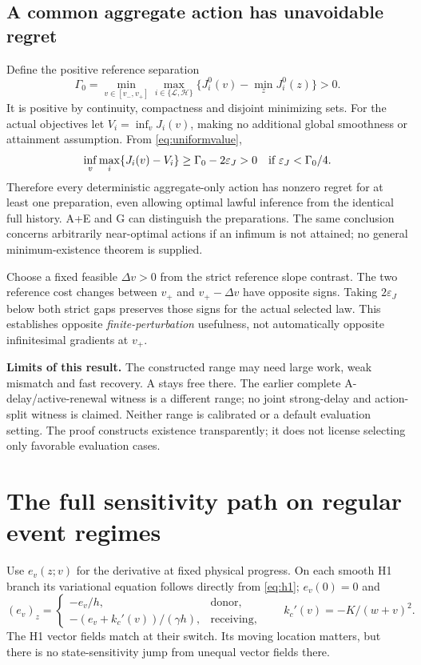 \documentclass[11pt,a4paper]{article}
\begin{document}
\subsection{A common aggregate action has unavoidable regret}
Define the positive reference separation
\begin{equation}
 \Gamma_0=\min_{v\in[v_-,v_+]}\max_{i\in\{\mathcal L,\mathcal H\}}
 \{J_i^0(v)-\min_zJ_i^0(z)\}>0.
 \label{eq:refregret}
\end{equation}
It is positive by continuity, compactness and disjoint minimizing sets.
For the actual objectives let $V_i=\inf_vJ_i(v)$, making no additional
global smoothness or attainment assumption. From \eqref{eq:uniformvalue},
\begin{equation}
 \inf_v\max_i\{J_i(v)-V_i\}\geq\Gamma_0-2\varepsilon_J>0
 \quad\hbox{if }\varepsilon_J<\Gamma_0/4.
 \label{eq:actualregret}
\end{equation}
Therefore every deterministic aggregate-only action has nonzero regret
for at least one preparation, even allowing optimal lawful inference from
the identical full history. A+E and G can distinguish the preparations.
The same conclusion concerns arbitrarily near-optimal actions if an
infimum is not attained; no general minimum-existence theorem is supplied.

Choose a fixed feasible $\Delta v>0$ from the strict reference slope
contrast. The two reference cost changes between $v_+$ and $v_+-\Delta v$
have opposite signs. Taking $2\varepsilon_J$ below both strict gaps
preserves those signs for the actual selected law. This establishes
opposite \emph{finite-perturbation} usefulness, not automatically opposite
infinitesimal gradients at $v_+$.

\textbf{Limits of this result.} The constructed range may need large work,
weak mismatch and fast recovery. A stays free there. The earlier complete
A-delay/active-renewal witness is a different range; no joint strong-delay
and action-split witness is claimed. Neither range is calibrated or a
default evaluation setting. The proof constructs existence transparently;
it does not license selecting only favorable evaluation cases.

\section{The full sensitivity path on regular event regimes}
Use $e_v(z;v)$ for the derivative at fixed physical progress. On each
smooth H1 branch its variational equation follows directly from
\eqref{eq:h1}; $e_v(0)=0$ and
\begin{equation}
 (e_v)_z=\begin{cases}
 -e_v/h,&\text{donor},\\
 -(e_v+k_c'(v))/(\gamma h),&\text{receiving},
 \end{cases}\qquad k_c'(v)=-K/(w+v)^2.
 \label{eq:prepderivative}
\end{equation}
The H1 vector fields match at their switch. Its moving location matters,
but there is no state-sensitivity jump from unequal vector fields there.
\end{document}
